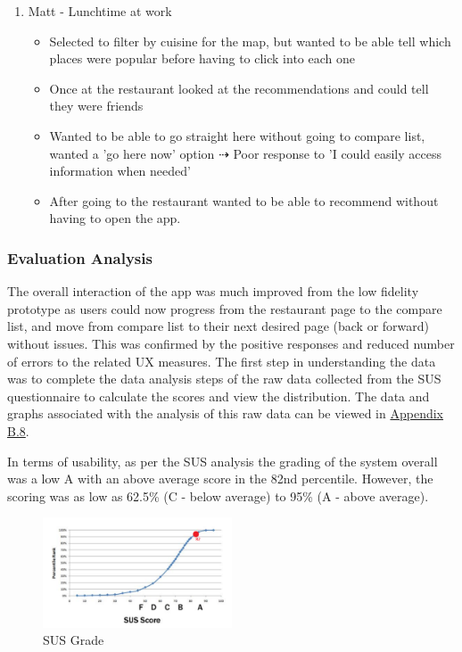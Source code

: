 \documentclass[a4 paper, 12pt]{article}
\begin{document}
\begin{enumerate}
            \item Matt - Lunchtime at work
                \begin{itemize}
                    \item Selected to filter by cuisine for the map, but wanted to be able tell which places were popular before having to click into each one
                    \item Once at the restaurant looked at the recommendations and could tell they were friends
                    \item Wanted to be able to go straight here without going to compare list, wanted a 'go here now' option $\dashrightarrow$ Poor response to 'I could easily access information when needed'
                    \item After going to the restaurant wanted to be able to recommend without having to open the app.
                \end{itemize}
        \end{enumerate}

    \subsubsection{Evaluation Analysis}
    The overall interaction of the app was much improved from the low fidelity prototype as users could now progress from the restaurant page to the compare list, and move from compare list to their next desired page (back or forward) without issues. This was confirmed by the positive responses and reduced number of errors to the related UX measures. The first step in understanding the data was to complete the data analysis steps of the raw data collected from the SUS questionnaire to calculate the scores and view the distribution. The data and graphs associated with the analysis of this raw data can be viewed in \hyperref[sec:B.8]{Appendix B.8}.

    In terms of usability, as per the SUS analysis the grading of the system overall was a low A with an above average score in the 82nd percentile. However, the scoring was as low as 62.5\% (C - below average) to 95\% (A - above average). 
    \begin{figure}[H]
        \centering
        \includegraphics[width=0.5\textwidth, frame]
            {./Med_Fidelity/Med_Report/images/Med_SUS_Grade.PNG} 
        \caption{SUS Grade}
    \end{figure}   
        
\end{document}
